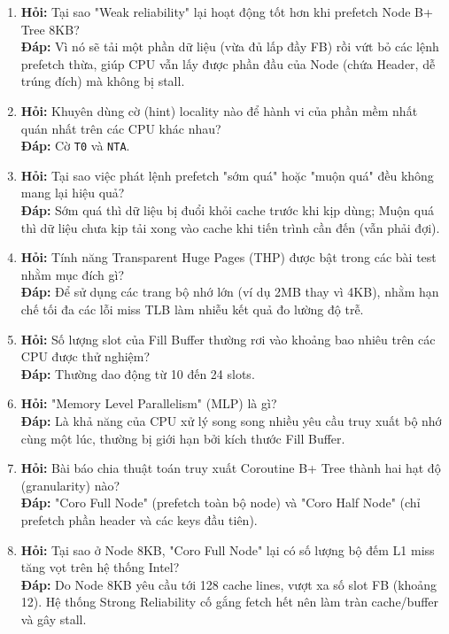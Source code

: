\documentclass[12pt,a4paper]{article}
\begin{document}
\begin{enumerate}
    \item \textbf{Hỏi:} Tại sao "Weak reliability" lại hoạt động tốt hơn khi prefetch Node B+ Tree 8KB? \\
    \textbf{Đáp:} Vì nó sẽ tải một phần dữ liệu (vừa đủ lấp đầy FB) rồi vứt bỏ các lệnh prefetch thừa, giúp CPU vẫn lấy được phần đầu của Node (chứa Header, dễ trúng đích) mà không bị stall.
    
    \item \textbf{Hỏi:} Khuyên dùng cờ (hint) locality nào để hành vi của phần mềm nhất quán nhất trên các CPU khác nhau? \\
    \textbf{Đáp:} Cờ \texttt{T0} và \texttt{NTA}.
    
    \item \textbf{Hỏi:} Tại sao việc phát lệnh prefetch "sớm quá" hoặc "muộn quá" đều không mang lại hiệu quả? \\
    \textbf{Đáp:} Sớm quá thì dữ liệu bị đuổi khỏi cache trước khi kịp dùng; Muộn quá thì dữ liệu chưa kịp tải xong vào cache khi tiến trình cần đến (vẫn phải đợi).
    
    \item \textbf{Hỏi:} Tính năng Transparent Huge Pages (THP) được bật trong các bài test nhằm mục đích gì? \\
    \textbf{Đáp:} Để sử dụng các trang bộ nhớ lớn (ví dụ 2MB thay vì 4KB), nhằm hạn chế tối đa các lỗi miss TLB làm nhiễu kết quả đo lường độ trễ.
    
    \item \textbf{Hỏi:} Số lượng slot của Fill Buffer thường rơi vào khoảng bao nhiêu trên các CPU được thử nghiệm? \\
    \textbf{Đáp:} Thường dao động từ 10 đến 24 slots.
    
    \item \textbf{Hỏi:} "Memory Level Parallelism" (MLP) là gì? \\
    \textbf{Đáp:} Là khả năng của CPU xử lý song song nhiều yêu cầu truy xuất bộ nhớ cùng một lúc, thường bị giới hạn bởi kích thước Fill Buffer.
    
    \item \textbf{Hỏi:} Bài báo chia thuật toán truy xuất Coroutine B+ Tree thành hai hạt độ (granularity) nào? \\
    \textbf{Đáp:} "Coro Full Node" (prefetch toàn bộ node) và "Coro Half Node" (chỉ prefetch phần header và các keys đầu tiên).
    
    \item \textbf{Hỏi:} Tại sao ở Node 8KB, "Coro Full Node" lại có số lượng bộ đếm L1 miss tăng vọt trên hệ thống Intel? \\
    \textbf{Đáp:} Do Node 8KB yêu cầu tới 128 cache lines, vượt xa số slot FB (khoảng 12). Hệ thống Strong Reliability cố gắng fetch hết nên làm tràn cache/buffer và gây stall.
    

\end{enumerate}
\end{document}
